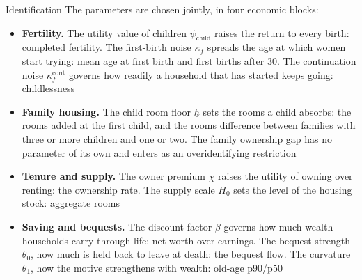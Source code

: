 \documentclass[11pt,aspectratio=169]{beamer}
\begin{document}
\begin{frame}{Identification}
\small\linespread{1.05}\selectfont
The parameters are chosen jointly, in four economic blocks:
\begin{itemize}
  \item \textbf{Fertility.} The utility value of children $\psi_{\mathrm{child}}$ raises the return to every birth: completed fertility. The first-birth noise $\kappa_f$ spreads the age at which women start trying: mean age at first birth and first births after 30. The continuation noise $\kappa_f^{\mathrm{cont}}$ governs how readily a household that has started keeps going: childlessness
  \item \textbf{Family housing.} The child room floor $\underline h$ sets the rooms a child absorbs: the rooms added at the first child, and the rooms difference between families with three or more children and one or two. The family ownership gap has no parameter of its own and enters as an overidentifying restriction
  \item \textbf{Tenure and supply.} The owner premium $\chi$ raises the utility of owning over renting: the ownership rate. The supply scale $H_0$ sets the level of the housing stock: aggregate rooms
  \item \textbf{Saving and bequests.} The discount factor $\beta$ governs how much wealth households carry through life: net worth over earnings. The bequest strength $\theta_0$, how much is held back to leave at death: the bequest flow. The curvature $\theta_1$, how the motive strengthens with wealth: old-age p90/p50
\end{itemize}
\end{frame}
\end{document}

